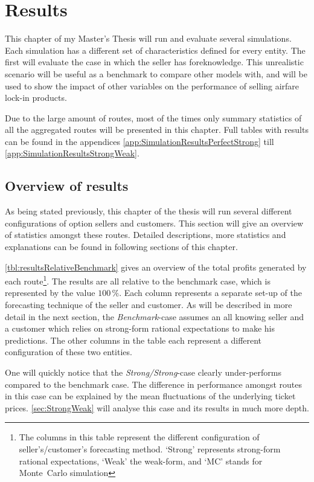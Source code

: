 \chapter{Results}
\label{chap:Results}
This chapter of my Master's Thesis will run and evaluate several simulations. Each simulation has a different set of characteristics defined for every entity. The first will evaluate the case in which the seller has foreknowledge. This unrealistic scenario will be useful as a benchmark to compare other models with, and will be used to show the impact of other variables on the performance of selling airfare lock-in products.

Due to the large amount of routes, most of the times only summary statistics of all the aggregated routes will be presented in this chapter. Full tables with results can be found in the appendices \ref{app:SimulationResultsPerfectStrong} till \ref{app:SimulationResultsStrongWeak}.



\section{Overview of results}
As being stated previously, this chapter of the thesis will run several different configurations of option sellers and customers. This section will give an overview of statistics amongst these routes. Detailed descriptions, more statistics and explanations can be found in following sections of this chapter.

\autoref{tbl:resultsRelativeBenchmark} gives an overview of the total profits generated by each route\footnote{The columns in this table represent the different configuration of seller's/customer's forecasting method. `Strong' represents strong-form rational expectations, `Weak' the weak-form, and `MC' stands for Monte~Carlo simulation}. The results are all relative to the benchmark case, which is represented by the value $100\,\%$. Each column represents a separate set-up of the forecasting technique of the seller and customer. As will be described in more detail in the next section, the \emph{Benchmark}-case assumes an all knowing seller and a customer which relies on strong-form rational expectations to make his predictions. The other columns in the table each represent a different configuration of these two entities.

One will quickly notice that the \emph{Strong/Strong}-case clearly under-performs compared to the benchmark case. The difference in performance amongst routes in this case can be explained by the mean fluctuations of the underlying ticket prices. \autoref{sec:StrongWeak} will analyse this case and its results in much more depth.

